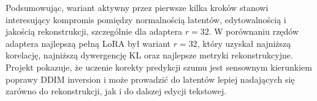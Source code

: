\documentclass[
    left=2.5cm,
    right=2.5cm,
    top=2.5cm,
    bottom=3cm,
    bindingoffset=6mm,
    nohyphenation=false
]{szablon/eiti/sprawozdanie}
\begin{document}
Podsumowując, wariant aktywny przez pierwsze kilka kroków stanowi
interesujący kompromis pomiędzy normalnością latentów, edytowalnością i
jakością rekonstrukcji, szczególnie dla adaptera $r=32$. W porównaniu
rzędów adaptera najlepszą pełną LoRA był wariant $r=32$, który uzyskał
najniższą korelację, najniższą dywergencję KL oraz najlepsze metryki
rekonstrukcyjne. Projekt pokazuje, że uczenie korekty predykcji szumu jest
sensownym kierunkiem poprawy DDIM inversion i może prowadzić do latentów
lepiej nadających się zarówno do rekonstrukcji, jak i do dalszej edycji
tekstowej.

\newpage
\printbibliography
\end{document}
